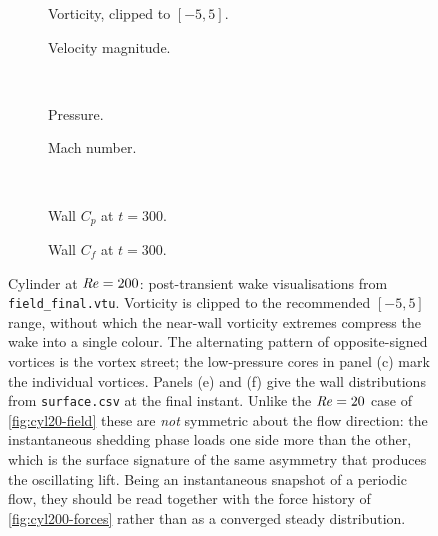 \begin{figure}[htbp]
  \centering
  \begin{subfigure}{0.49\textwidth}\centering
    \caption{Vorticity, clipped to $[-5,5]$.}
  \end{subfigure}\hfill
  \begin{subfigure}{0.49\textwidth}\centering
    \caption{Velocity magnitude.}
  \end{subfigure}\\[6pt]
  \begin{subfigure}{0.49\textwidth}\centering
    \caption{Pressure.}
  \end{subfigure}\hfill
  \begin{subfigure}{0.49\textwidth}\centering
    \caption{Mach number.}
  \end{subfigure}\\[6pt]
  \begin{subfigure}{0.49\textwidth}\centering
    \caption{Wall $C_p$ at $t=300$.}
  \end{subfigure}\hfill
  \begin{subfigure}{0.49\textwidth}\centering
    \caption{Wall $C_f$ at $t=300$.}
  \end{subfigure}
  \caption{Cylinder at $\mathit{Re}=200$: post-transient wake visualisations from
  \texttt{field\_final.vtu}. Vorticity is clipped to the recommended $[-5,5]$
  range, without which the near-wall vorticity extremes compress the wake into a
  single colour. The alternating pattern of opposite-signed vortices is the
  vortex street; the low-pressure cores in panel (c) mark the individual
  vortices. Panels (e) and (f) give the wall distributions from \texttt{surface.csv} at the
  final instant. Unlike the $\mathit{Re}=20$ case of \cref{fig:cyl20-field} these are
  \emph{not} symmetric about the flow direction: the instantaneous shedding phase loads one
  side more than the other, which is the surface signature of the same asymmetry that
  produces the oscillating lift. Being an instantaneous snapshot of a periodic flow, they
  should be read together with the force history of \cref{fig:cyl200-forces} rather than as a
  converged steady distribution.}
  \label{fig:cyl200-wake}
\end{figure}
